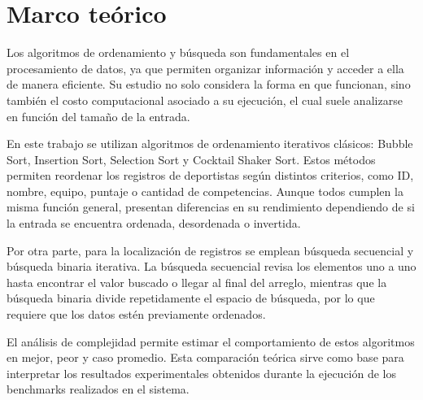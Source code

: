 \chapter{Marco teórico}

Los algoritmos de ordenamiento y búsqueda son fundamentales en el procesamiento de datos, ya que permiten organizar información y acceder a ella de manera eficiente. Su estudio no solo considera la forma en que funcionan, sino también el costo computacional asociado a su ejecución, el cual suele analizarse en función del tamaño de la entrada.

En este trabajo se utilizan algoritmos de ordenamiento iterativos clásicos: Bubble Sort, Insertion Sort, Selection Sort y Cocktail Shaker Sort. Estos métodos permiten reordenar los registros de deportistas según distintos criterios, como ID, nombre, equipo, puntaje o cantidad de competencias. Aunque todos cumplen la misma función general, presentan diferencias en su rendimiento dependiendo de si la entrada se encuentra ordenada, desordenada o invertida.

Por otra parte, para la localización de registros se emplean búsqueda secuencial y búsqueda binaria iterativa. La búsqueda secuencial revisa los elementos uno a uno hasta encontrar el valor buscado o llegar al final del arreglo, mientras que la búsqueda binaria divide repetidamente el espacio de búsqueda, por lo que requiere que los datos estén previamente ordenados.

El análisis de complejidad permite estimar el comportamiento de estos algoritmos en mejor, peor y caso promedio. Esta comparación teórica sirve como base para interpretar los resultados experimentales obtenidos durante la ejecución de los benchmarks realizados en el sistema.
